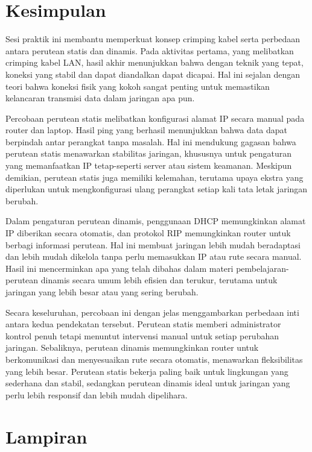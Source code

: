 \section{Kesimpulan}
Sesi praktik ini membantu memperkuat konsep crimping kabel serta perbedaan 
antara perutean statis dan dinamis. Pada aktivitas pertama, yang melibatkan 
crimping kabel LAN, hasil akhir menunjukkan bahwa dengan teknik yang tepat, 
koneksi yang stabil dan dapat diandalkan dapat dicapai. Hal ini sejalan 
dengan teori bahwa koneksi fisik yang kokoh sangat penting untuk memastikan 
kelancaran transmisi data dalam jaringan apa pun.

Percobaan perutean statis melibatkan konfigurasi alamat IP secara manual 
pada router dan laptop. Hasil ping yang berhasil menunjukkan bahwa data 
dapat berpindah antar perangkat tanpa masalah. Hal ini mendukung gagasan 
bahwa perutean statis menawarkan stabilitas jaringan, khususnya untuk 
pengaturan yang memanfaatkan IP tetap-seperti server atau sistem keamanan. 
Meskipun demikian, perutean statis juga memiliki kelemahan, terutama upaya 
ekstra yang diperlukan untuk mengkonfigurasi ulang perangkat setiap kali 
tata letak jaringan berubah.

Dalam pengaturan perutean dinamis, penggunaan DHCP memungkinkan alamat IP 
diberikan secara otomatis, dan protokol RIP memungkinkan router untuk 
berbagi informasi perutean. Hal ini membuat jaringan lebih mudah beradaptasi 
dan lebih mudah dikelola tanpa perlu memasukkan IP atau rute secara manual. 
Hasil ini mencerminkan apa yang telah dibahas dalam materi pembelajaran-
perutean dinamis secara umum lebih efisien dan terukur, terutama untuk 
jaringan yang lebih besar atau yang sering berubah.

Secara keseluruhan, percobaan ini dengan jelas menggambarkan perbedaan inti 
antara kedua pendekatan tersebut. Perutean statis memberi administrator 
kontrol penuh tetapi menuntut intervensi manual untuk setiap perubahan 
jaringan. Sebaliknya, perutean dinamis memungkinkan router untuk 
berkomunikasi dan menyesuaikan rute secara otomatis, menawarkan 
fleksibilitas yang lebih besar. Perutean statis bekerja paling baik untuk 
lingkungan yang sederhana dan stabil, sedangkan perutean dinamis ideal 
untuk jaringan yang perlu lebih responsif dan lebih mudah dipelihara.

\section{Lampiran}
